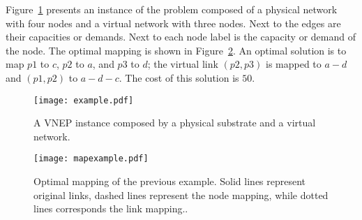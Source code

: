 \documentclass[conference]{IEEEtran}
\begin{document}
Figure~\ref{fig:auxex} presents an instance of the problem composed of a physical network with four nodes and a virtual network with three nodes. Next to the edges are their capacities or demands. Next to each node label is the capacity or demand of the node.
The optimal mapping is shown in Figure~\ref{fig:mapping}. 
An optimal solution is to map $p1$ to $c$, $p2$ to $a$, and $p3$ to $d$;
the virtual link $(p2,p3)$ is mapped to $a-d$ and $(p1,p2)$ to $a-d-c$. The cost of this solution is $50$.

\begin{comment}
\begin{figure}
  \centering
  \begin{subfigure}[b]{0.45\textwidth}
    \centering
    \texttt{[image: example.pdf]}
  \end{subfigure}\quad
  \begin{subfigure}[b]{0.45\textwidth}
    \centering
    \texttt{[image: mapexample.pdf]}
  \end{subfigure}
  \caption{(left) and the corresponding optimal mapping (right).
In the figure on the right, 
\label{fig:example}}
\end{figure}
\end{comment}

  \begin{figure}
  \centering
    \texttt{[image: example.pdf]}
    \caption{A VNEP instance composed by a physical substrate and a virtual network.\label{fig:auxex}}
  \end{figure}\quad
  \begin{figure}
    \centering
    \texttt{[image: mapexample.pdf]}
    \caption{Optimal mapping of the previous example. Solid lines represent original links, dashed lines represent the node mapping, while dotted lines corresponds the link mapping.\label{fig:mapping}.}
  \end{figure}

\end{document}
